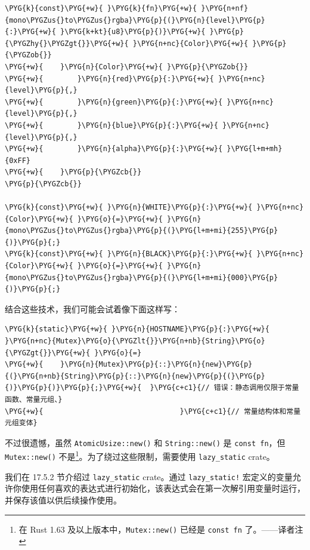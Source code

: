 \begin{Verbatim}[commandchars=\\\{\},breaklines=true,breakanywhere=true,fontsize=\codefont,xleftmargin=17bp]
\PYG{k}{const}\PYG{+w}{ }\PYG{k}{fn}\PYG{+w}{ }\PYG{n+nf}{mono\PYGZus{}to\PYGZus{}rgba}\PYG{p}{(}\PYG{n}{level}\PYG{p}{:}\PYG{+w}{ }\PYG{k+kt}{u8}\PYG{p}{)}\PYG{+w}{ }\PYG{p}{\PYGZhy{}\PYGZgt{}}\PYG{+w}{ }\PYG{n+nc}{Color}\PYG{+w}{ }\PYG{p}{\PYGZob{}}
\PYG{+w}{    }\PYG{n}{Color}\PYG{+w}{ }\PYG{p}{\PYGZob{}}
\PYG{+w}{        }\PYG{n}{red}\PYG{p}{:}\PYG{+w}{ }\PYG{n+nc}{level}\PYG{p}{,}
\PYG{+w}{        }\PYG{n}{green}\PYG{p}{:}\PYG{+w}{ }\PYG{n+nc}{level}\PYG{p}{,}
\PYG{+w}{        }\PYG{n}{blue}\PYG{p}{:}\PYG{+w}{ }\PYG{n+nc}{level}\PYG{p}{,}
\PYG{+w}{        }\PYG{n}{alpha}\PYG{p}{:}\PYG{+w}{ }\PYG{l+m+mh}{0xFF}
\PYG{+w}{    }\PYG{p}{\PYGZcb{}}
\PYG{p}{\PYGZcb{}}

\PYG{k}{const}\PYG{+w}{ }\PYG{n}{WHITE}\PYG{p}{:}\PYG{+w}{ }\PYG{n+nc}{Color}\PYG{+w}{ }\PYG{o}{=}\PYG{+w}{ }\PYG{n}{mono\PYGZus{}to\PYGZus{}rgba}\PYG{p}{(}\PYG{l+m+mi}{255}\PYG{p}{)}\PYG{p}{;}
\PYG{k}{const}\PYG{+w}{ }\PYG{n}{BLACK}\PYG{p}{:}\PYG{+w}{ }\PYG{n+nc}{Color}\PYG{+w}{ }\PYG{o}{=}\PYG{+w}{ }\PYG{n}{mono\PYGZus{}to\PYGZus{}rgba}\PYG{p}{(}\PYG{l+m+mi}{000}\PYG{p}{)}\PYG{p}{;}
\end{Verbatim}

结合这些技术，我们可能会试着像下面这样写：

\begin{Verbatim}[commandchars=\\\{\},breaklines=true,breakanywhere=true,fontsize=\codefont,xleftmargin=17bp]
\PYG{k}{static}\PYG{+w}{ }\PYG{n}{HOSTNAME}\PYG{p}{:}\PYG{+w}{ }\PYG{n+nc}{Mutex}\PYG{o}{\PYGZlt{}}\PYG{n+nb}{String}\PYG{o}{\PYGZgt{}}\PYG{+w}{ }\PYG{o}{=}
\PYG{+w}{    }\PYG{n}{Mutex}\PYG{p}{::}\PYG{n}{new}\PYG{p}{(}\PYG{n+nb}{String}\PYG{p}{::}\PYG{n}{new}\PYG{p}{(}\PYG{p}{)}\PYG{p}{)}\PYG{p}{;}\PYG{+w}{  }\PYG{c+c1}{// 错误：静态调用仅限于常量函数、常量元组、}
\PYG{+w}{                                }\PYG{c+c1}{// 常量结构体和常量元组变体}
\end{Verbatim}

不过很遗憾，虽然 \texttt{AtomicUsize::new()} 和 \texttt{String::new()} 是 \texttt{const fn}，但 \texttt{Mutex::new()} 不是\footnote{在 Rust 1.63 及以上版本中，\texttt{Mutex::new()} 已经是 \texttt{const fn} 了。——译者注}。为了绕过这些限制，需要使用 \texttt{lazy\_static} crate。

我们在 17.5.2 节介绍过 \texttt{lazy\_static} crate。通过 \texttt{lazy\_static!} 宏定义的变量允许你使用任何喜欢的表达式进行初始化，该表达式会在第一次解引用变量时运行，并保存该值以供后续操作使用。

